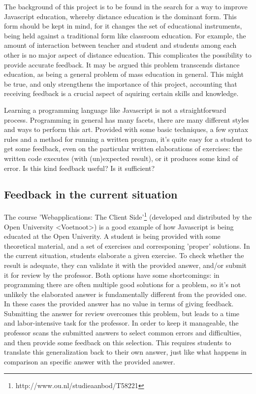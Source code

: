 \documentclass{article}
\begin{document}
The background of this project is to be found in the search for a way to improve Javascript education, whereby distance education is the dominant form. This form should be kept in mind, for it changes the set of educational instruments, being held against a traditional form like classroom education. For example, the amount of interaction between teacher and student and students among each other is no major aspect of distance education. This complicates the possibility to provide accurate feedback. It may be argued this problem transcends distance education, as being a general problem of mass education in general. This might be true, and only strengthens the importance of this project, accounting that receiving feedback is a crucial aspect of aquiring certain skills and knowledge. 

Learning a programming language like Javascript is not a straightforward process. Programming in general has many facets, there are many different styles and ways to perform this art. Provided with some basic techniques, a few syntax rules and a method for running a written program, it's quite easy for a student to get some feedback, even on the particular written elaborations of exercises: the written code executes (with (un)expected result), or it produces some kind of error. Is this kind feedback useful? Is it sufficient? 

\subsection{Feedback in the current situation}

The course 'Webapplications: The Client Side'\footnote{http://www.ou.nl/studieaanbod/T58221} (developed and distributed by the Open University <Voetnoot>) is a good example of how Javascript is being educated at the Open Univerity. A student is being provided with some theoretical material, and a set of exercises and corresponing 'proper' solutions. In the current situation, students elaborate a given exercise. To check whether the result is adequate, they can validate it with the provided answer, and/or submit it for review by the professor. Both options have some shortcomings: in programming there are often multiple good solutions for a problem, so it’s not unlikely the elaborated answer is fundamentally different from the provided one. In these cases the provided answer has no value in terms of giving feedback. Submitting the answer for review overcomes this problem, but leads to a time and labor-intensive task for the professor. In order to keep it manageable, the professor scans the submitted answers to select common errors and difficulties, and then provide some feedback on this selection. This requires students to translate this generalization back to their own answer, just like what happens in comparison an specific answer with the provided answer.
\end{document}
